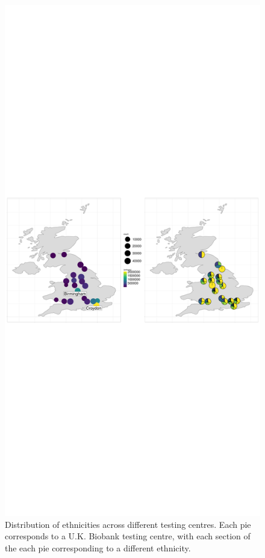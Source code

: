\begin{figure}
    \centering
    \includegraphics[width=1.0\textwidth]{../images/chapter3/SF_props_pie_chart.pdf}
    \caption{Distribution of ethnicities across different testing centres. Each pie corresponds to a U.K. Biobank testing centre, with each section of the each pie corresponding to a different ethnicity.}
    \label{fig:country_of_origin_allInds}
\end{figure}

